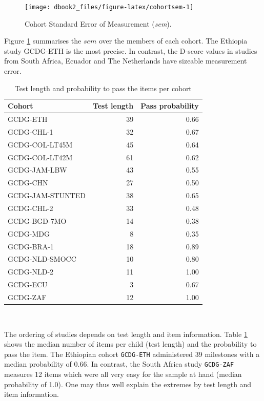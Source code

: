 \documentclass[
]{book}
\begin{document}
\begin{figure}

{\centering \texttt{[image: dbook2\_files/figure-latex/cohortsem-1]} 

}

\caption{Cohort Standard Error of Measurement (\emph{sem}).}\label{fig:cohortsem}
\end{figure}



Figure \ref{fig:cohortsem} summarises the \(sem\) over the members of each cohort. The Ethiopia study GCDG-ETH is the most precise. In contrast, the D-score values in studies from South Africa, Ecuador and The Netherlands have sizeable measurement error.

\begin{table}

\caption{\label{tab:npsem}Test length and probability to pass the items per cohort}
\centering
\begin{tabular}[t]{lrr}
\toprule
Cohort & Test length & Pass probability\\
\midrule
GCDG-ETH & 39 & 0.66\\
GCDG-CHL-1 & 32 & 0.67\\
GCDG-COL-LT45M & 45 & 0.64\\
GCDG-COL-LT42M & 61 & 0.62\\
GCDG-JAM-LBW & 43 & 0.55\\
\addlinespace
GCDG-CHN & 27 & 0.50\\
GCDG-JAM-STUNTED & 38 & 0.65\\
GCDG-CHL-2 & 33 & 0.48\\
GCDG-BGD-7MO & 14 & 0.38\\
GCDG-MDG & 8 & 0.35\\
\addlinespace
GCDG-BRA-1 & 18 & 0.89\\
GCDG-NLD-SMOCC & 10 & 0.80\\
GCDG-NLD-2 & 11 & 1.00\\
GCDG-ECU & 3 & 0.67\\
GCDG-ZAF & 12 & 1.00\\
\bottomrule
\end{tabular}
\end{table}

~

The ordering of studies depends on test length and item information. Table \ref{tab:npsem} shows the median number of items per child (test length) and the probability to pass the item. The Ethiopian cohort \texttt{GCDG-ETH} administered 39 milestones with a median probability of 0.66. In contrast, the South Africa study \texttt{GCDG-ZAF} measures 12 items which were all very easy for the sample at hand (median probability of 1.0). One may thus well explain the extremes by test length and item information.
\end{document}
